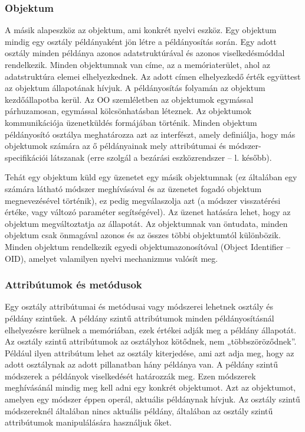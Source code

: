\subsubsection{Objektum}
A másik alapeszköz az objektum, ami konkrét nyelvi eszköz. Egy objektum mindig egy osztály példányaként jön létre a példányosítás során. Egy adott osztály minden példánya azonos adatstruktúrával és azonos viselkedésmóddal rendelkezik. Minden objektumnak van címe, az a memóriaterület, ahol az adatstruktúra elemei elhelyezkednek. Az adott címen elhelyezkedő érték együttest az objektum állapotának hívjuk. A példányosítás folyamán az objektum kezdőállapotba kerül. Az OO szemléletben az objektumok egymással párhuzamosan, egymással kölcsönhatásban léteznek. Az objektumok kommunikációja üzenetküldés formájában történik. Minden objektum példányosító osztálya meghatározza azt az interfészt, amely definiálja, hogy más objektumok számára az ő példányainak mely attribútumai és módszer-specifikációi látszanak (erre szolgál a bezárási eszközrendszer -- l. később).

Tehát egy objektum küld egy üzenetet egy másik objektumnak (ez általában egy számára látható módszer meghívásával és az üzenetet fogadó objektum megnevezésével történik), ez pedig megválaszolja azt (a módszer visszatérési értéke, vagy változó paraméter segítségével). Az üzenet hatására lehet, hogy az objektum megváltoztatja az állapotát. Az objektumnak van öntudata, minden objektum csak önmagával azonos és az összes többi objektumtól különbözik. Minden objektum rendelkezik egyedi objektumazonosítóval (Object Identifier -- OID), amelyet valamilyen nyelvi mechanizmus valósít meg.

\subsubsection{Attribútumok és metódusok}
Egy osztály attribútumai és metódusai vagy módszerei lehetnek osztály és példány szintűek. A példány szintű attribútumok minden példányosításnál elhelyezésre kerülnek a memóriában, ezek értékei adják meg a példány állapotát. Az osztály szintű attribútumok az osztályhoz kötődnek, nem „többszöröződnek”. Például ilyen attribútum lehet az osztály kiterjedése, ami azt adja meg, hogy az adott osztálynak az adott pillanatban hány példánya van. A példány szintű módszerek a példányok viselkedését határozzák meg. Ezen módszerek meghívásánál mindig meg kell adni egy konkrét objektumot. Azt az objektumot, amelyen egy módszer éppen operál, aktuális példánynak hívjuk. Az osztály szintű módszereknél általában nincs aktuális példány, általában az osztály szintű attribútumok manipulálására használjuk őket.

